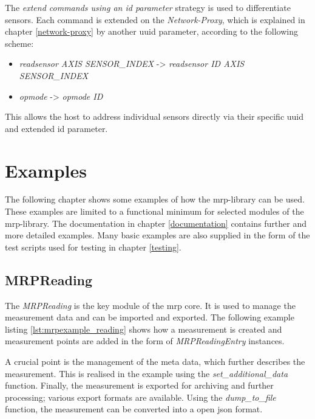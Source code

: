 The \emph{extend commands using an id parameter} strategy is used to
differentiate sensors. Each command is extended on the
\emph{Network-Proxy}, which is explained in chapter \ref{network-proxy}
by another \gls{uuid} parameter, according to the following scheme:

\begin{itemize}
\tightlist
\item
  \emph{readsensor AXIS SENSOR\_INDEX} -\textgreater{} \emph{readsensor
  ID AXIS SENSOR\_INDEX}
\item
  \emph{opmode} -\textgreater{} \emph{opmode ID}
\end{itemize}

This allows the host to address individual sensors directly via their
specific \gls{uuid} and extended id parameter.

\hypertarget{examples}{%
\section{Examples}\label{examples}}

The following chapter shows some examples of how the \gls{mrp}-library
can be used. These examples are limited to a functional minimum for
selected modules of the \gls{mrp}-library. The documentation in chapter
\ref{documentation} contains further and more detailed examples. Many
basic examples are also supplied in the form of the test scripts used
for testing in chapter \ref{testing}.

\hypertarget{mrpreading}{%
\subsection{MRPReading}\label{mrpreading}}

The \emph{MRPReading} is the key module of the \gls{mrp} core. It is
used to manage the measurement data and can be imported and exported.
The following example listing \ref{lst:mrpexample_reading} shows how a
measurement is created and measurement points are added in the form of
\emph{MRPReadingEntry} instances.

A crucial point is the management of the meta data, which further
describes the measurement. This is realised in the example using the
\emph{set\_additional\_data} function. Finally, the measurement is
exported for archiving and further processing; various export formats
are available. Using the \emph{dump\_to\_file} function, the measurement
can be converted into a open \gls{json} format.


